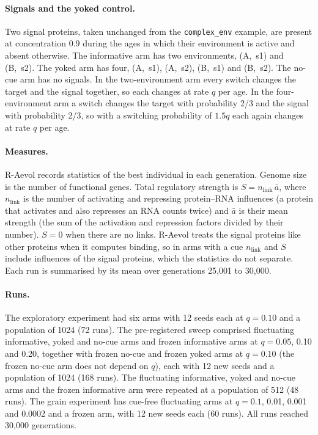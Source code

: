 \documentclass[10pt,letterpaper]{article}
\begin{document}
\paragraph*{Signals and the yoked control.} Two signal proteins, taken unchanged
from the \texttt{complex\_env} example, are present at concentration 0.9 during
the ages in which their environment is active and absent otherwise. The
informative arm has two environments, (A,~s1) and (B,~s2). The yoked arm has four,
(A,~s1), (A,~s2), (B,~s1) and (B,~s2). The no-cue arm has no signals. In the
two-environment arm every switch changes the target and the signal together, so each changes at rate $q$ per age. In the four-environment arm a switch changes the
target with probability 2/3 and the signal with probability 2/3, so with a
switching probability of $1.5q$ each again changes at rate $q$ per age.

\paragraph*{Measures.} R-Aevol records statistics of the best individual in each
generation. Genome size is the number of functional genes. Total regulatory
strength is $S = n_\mathrm{link}\,\bar{a}$, where $n_\mathrm{link}$ is the number of
activating and repressing protein--RNA influences (a protein that activates
and also represses an RNA counts twice) and $\bar{a}$ is their mean strength (the sum of the activation and repression factors divided by their number). $S=0$ when there are no links. R-Aevol treats the signal proteins like other
proteins when it computes binding, so in arms with a cue $n_\mathrm{link}$ and $S$
include influences of the signal proteins, which the statistics do not
separate.
Each run is summarised by its mean over generations 25{,}001 to 30{,}000.

\paragraph*{Runs.} The exploratory experiment had six arms with 12 seeds each at
$q=0.10$ and a population of 1024 (72 runs). The pre-registered sweep comprised
fluctuating informative, yoked and no-cue arms and frozen informative arms at
$q=0.05$, 0.10 and 0.20, together with frozen no-cue and frozen yoked arms at
$q=0.10$ (the frozen no-cue arm does not depend on $q$), each with 12 new seeds
and a population of 1024 (168 runs). The fluctuating informative, yoked and
no-cue arms and the frozen informative arm were repeated at a population of 512
(48 runs). The grain experiment has cue-free fluctuating arms at $q=0.1$, 0.01,
0.001 and 0.0002 and a frozen arm, with 12 new seeds each (60 runs). All runs reached 30{,}000 generations.
\end{document}

